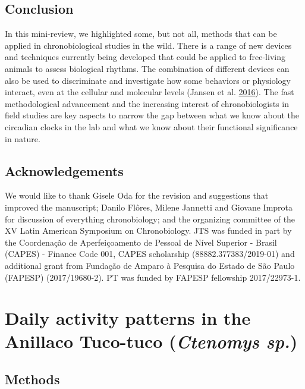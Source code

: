 \documentclass[msc,numbers,hidelinks]{coppe}
\begin{document}
  \hypertarget{conclusion}{%
  \section{Conclusion}\label{conclusion}}

  In this mini-review, we highlighted some, but not all, methods that can be applied in chronobiological studies in the wild. There is a range of new devices and techniques currently being developed that could be applied to free-living animals to assess biological rhythms. The combination of different devices can also be used to discriminate and investigate how some behaviors or physiology interact, even at the cellular and molecular levels (Jansen et al. \protect\hyperlink{ref-jansenBearCircadianClock2016}{2016}). The fast methodological advancement and the increasing interest of chronobiologists in field studies are key aspects to narrow the gap between what we know about the circadian clocks in the lab and what we know about their functional significance in nature.

  \hypertarget{acknowledgements}{%
  \section{Acknowledgements}\label{acknowledgements}}

  We would like to thank Gisele Oda for the revision and suggestions that improved the manuscript; Danilo Flôres, Milene Jannetti and Giovane Improta for discussion of everything chronobiology; and the organizing committee of the XV Latin American Symposium on Chronobiology. JTS was funded in part by the Coordenação de Aperfeiçoamento de Pessoal de Nível Superior - Brasil (CAPES) - Finance Code 001, CAPES scholarship (88882.377383/2019-01) and additional grant from Fundação de Amparo à Pesquisa do Estado de São Paulo (FAPESP) (2017/19680-2). PT was funded by FAPESP fellowship 2017/22973-1.

  \hypertarget{daily-activity-patterns-in-the-anillaco-tuco-tuco-ctenomys-sp.}{%
  \chapter{\texorpdfstring{Daily activity patterns in the Anillaco Tuco-tuco (\emph{Ctenomys sp.})}{Daily activity patterns in the Anillaco Tuco-tuco (Ctenomys sp.)}}\label{daily-activity-patterns-in-the-anillaco-tuco-tuco-ctenomys-sp.}}

  \hypertarget{methods}{%
  \section{Methods}\label{methods}}
\end{document}
